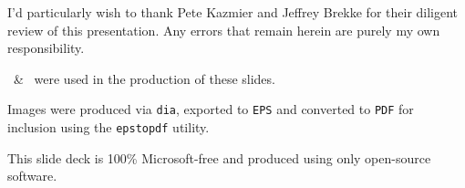 \documentclass[20pt,landscape,headrule,footrule]{foils}
\begin{document}

I'd particularly wish to thank Pete Kazmier and Jeffrey Brekke
for their diligent review of this presentation.  Any errors that 
remain herein are purely my own responsibility.


\FoilTeX\ \& \LaTeXe\ were used in the production of these
slides.  

Images were produced via \texttt{dia}, exported to \texttt{EPS} 
and converted to \texttt{PDF} for inclusion using 
the \texttt{epstopdf} utility.

This slide deck is 100\% Microsoft-free and produced using
only open-source software.
\end{document}
